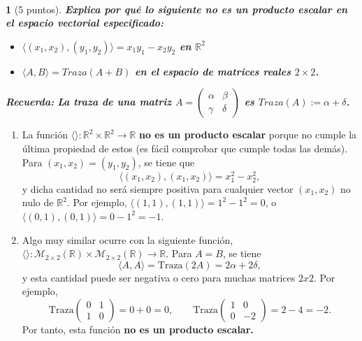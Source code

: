 \documentclass[12pt,a4paper]{report}
\newtheorem{ex}{}
\newcommand{\RR}{\ensuremath{\mathbb R}}
\begin{document}
\hrulefill{}\\ 
\begin{ex}[5 puntos]   
{\bf Explica por qu\'e lo siguiente \emph{no} es un producto escalar en el espacio vectorial especificado:}
\begin{itemize}
\item[a)] {\bf $\langle (x_1,x_2), (y_1,y_2) \rangle=x_1y_1-x_2y_2$ en $\RR^2$}
\item[b)] {\bf $\langle A,B\rangle=Traza(A+B)$ en el espacio de matrices reales $2 \times 2$.}
\end{itemize}
{\bf Recuerda:} {\bf La traza de una matriz $A=\left(\begin{array}{cc}\alpha & \beta \\ \gamma & \delta\end{array}\right)$ es $Traza(A):=\alpha+\delta$.}
\end{ex}

\begin{enumerate}
 \item La funci\'on $\langle\rangle:\mathbb{R}^2\times\mathbb{R}^2\rightarrow\mathbb{R}$ {\bf no es un producto escalar} porque no cumple la \'ultima propiedad de estos (es f\'acil comprobar que cumple todas las dem\'as). Para $(x_1,x_2)=(y_1,y_2)$, se tiene que
 \[
  \langle (x_1,x_2),(x_1,x_2) \rangle = x_1^2 - x_2^2,
 \]
y dicha cantidad no ser\'a siempre positiva para cualquier vector $(x_1,x_2)$ no nulo de $\mathbb{R}^2$. Por ejemplo, $\langle(1,1),(1,1)\rangle = 1^2 - 1^2 = 0$, o $\langle(0,1),(0,1)\rangle = 0 - 1^2 = -1$.
 \item Algo muy similar ocurre con la siguiente funci\'on, $\langle\rangle:\mathcal{M}_{2\times 2}(\mathbb{R})\times\mathcal{M}_{2\times 2}(\mathbb{R})\rightarrow\mathbb{R}$. Para $A=B$, se tiene
 \[
  \langle A,A\rangle = \text{Traza}(2A) = 2\alpha + 2\delta,
 \]
y esta cantidad puede ser negativa o cero para muchas matrices $2x2$. Por ejemplo,
\[
 \text{Traza}\begin{pmatrix} 0 & 1 \\ 1 & 0\end{pmatrix} = 0 + 0 = 0,\qquad \text{Traza}\begin{pmatrix} 1 & 0 \\ 0 & -2\end{pmatrix} = 2-4 = -2.
\]
Por tanto, esta funci\'on {\bf no es un producto escalar.}

\end{enumerate}
 


 
\end{document}
